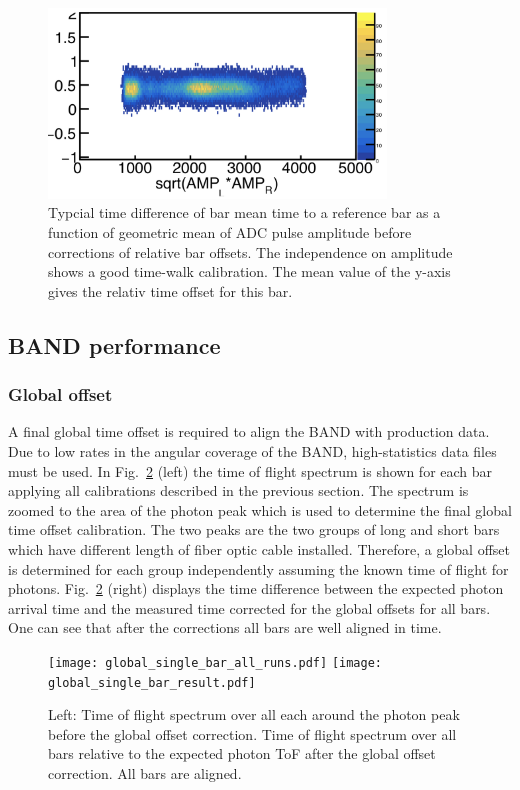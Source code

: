 \documentclass[3p,final,twocolumn]{elsarticle}
\begin{document}
{\begin{figure}[h!]
	\centering
		\includegraphics[width=0.8\textwidth]{bar_offset.png}
	\caption{Typcial time difference of bar mean time to a reference bar as a function of geometric mean of ADC pulse amplitude before corrections of relative bar offsets. The independence on amplitude shows a good time-walk calibration. The mean value of the y-axis gives the relativ time offset for this bar.}
	\label{fig:bar_off}
\end{figure}

\subsection{BAND performance} 
\subsubsection{Global offset}
\label{sec:global_offset}
A final global time offset is required to align the BAND with production data. Due to low rates in the angular coverage of the BAND, 
high-statistics data files must be used. 
In Fig.~\ref{fig:final_offset} (left) the time of flight spectrum is shown for each bar applying all calibrations described in the previous section. The spectrum is zoomed to the area of the photon peak which is used to determine the final global time offset calibration. The two peaks are the two groups of long and short bars which have different length of fiber optic cable installed. Therefore, a global offset is determined for each group independently assuming the known time of flight for photons. Fig.~\ref{fig:final_offset} (right) displays the time difference between the expected photon arrival time and the measured time corrected for the global offsets for all bars. One can see that after the corrections all bars are well aligned in time.
\begin{figure}[h!]
	\centering
		\texttt{[image: global\_single\_bar\_all\_runs.pdf]}
		\texttt{[image: global\_single\_bar\_result.pdf]}
	\caption{Left: Time of flight spectrum over all each around the photon peak before the global offset correction. Time of flight spectrum over all bars relative to the expected photon ToF after  the global offset correction. All bars are aligned.}
	\label{fig:final_offset}
\end{figure}

}
\end{document}
